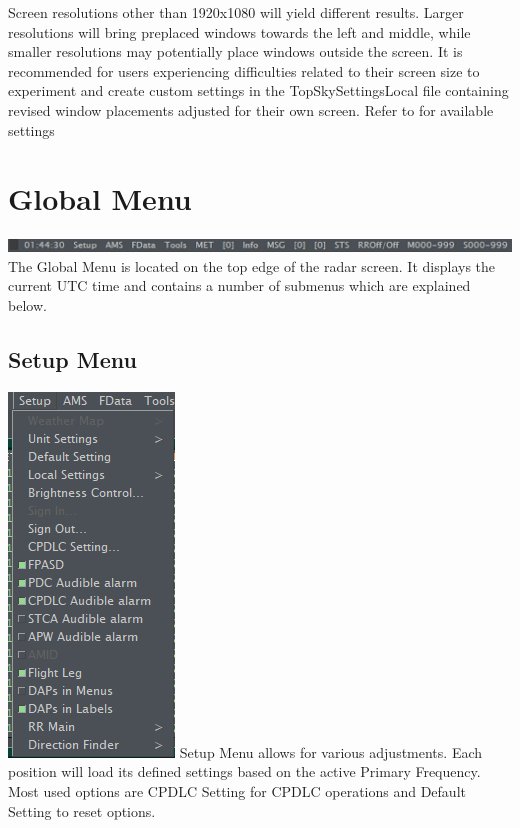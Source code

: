 \documentclass[11pt,a4paper,oldfontcommands]{memoir}
\begin{document}
Screen resolutions other than 1920x1080 will yield different results. Larger resolutions will bring preplaced windows towards the left and middle, while smaller resolutions may potentially place windows outside the screen. It is recommended for users experiencing difficulties related to their screen size to experiment and create custom settings in the TopSkySettingsLocal file containing revised window placements adjusted for their own screen. Refer to \texttt{} for available settings
\medskip

\section{Global Menu}
\includegraphics{img/globalmenu.png}
\medskip
The Global Menu is located on the top edge of the radar screen. It displays the current UTC time and contains a number of submenus which are explained below.

\subsection{Setup Menu}
\includegraphics{img/Setup.png}
\medskip
Setup Menu allows for various adjustments. Each position will load its defined settings based on the active Primary Frequency.
\medskip 
Most used options are CPDLC Setting for CPDLC operations and Default Setting to reset options.
\medskip
\end{document}
